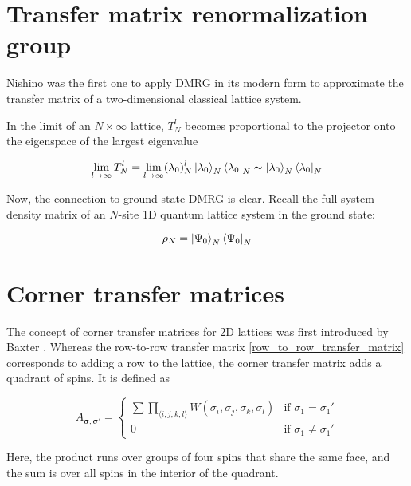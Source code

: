 \section{Transfer matrix renormalization group}

Nishino \cite{nishino1995density} was the first one to apply DMRG in its modern
form to approximate the transfer matrix of a two-dimensional classical lattice system.

In the limit of an $N \times \infty$ lattice, $T_{N}^{l}$ becomes proportional
to the projector onto the eigenspace of the largest eigenvalue

\begin{equation}
  \lim_{l \to \infty} T_{N}^{l} = \lim_{l \to \infty} (\lambda_0)_{N}^{l} \ket{\lambda_0}_{N}\bra{\lambda_0}_{N} \thicksim \ket{\lambda_0}_{N}\bra{\lambda_0}_N
\end{equation}

Now, the connection to ground state DMRG is clear. Recall the full-system density matrix of an $N$-site 1D quantum lattice system in the ground state:

\begin{equation}
  \rho_N = \ket{\Psi_0}_{N}\bra{\Psi_0}_{N}
\end{equation}




\section{Corner transfer matrices}

The concept of corner transfer matrices for 2D lattices was first introduced by
Baxter \cite{baxter1968dimers, baxter1978variational, baxter1982exactly}.
Whereas the row-to-row transfer matrix \eqref{row_to_row_transfer_matrix}
corresponds to adding a row to the lattice, the corner transfer matrix adds
a quadrant of spins. It is defined as

\begin{equation}
  A_{\bm{\sigma}, \bm{\sigma'}} =
  \begin{cases}
    \sum \prod_{\langle i, j, k, l \rangle} W(\sigma_i, \sigma_j, \sigma_k, \sigma_l) & \text{if } \sigma_{1} = \sigma_{1}' \\
    0 & \text{if } \sigma_{1} \neq \sigma_{1}'
  \end{cases}
\end{equation}

Here, the product runs over groups of four spins that share the same face, and
the sum is over all spins in the interior of the quadrant.



